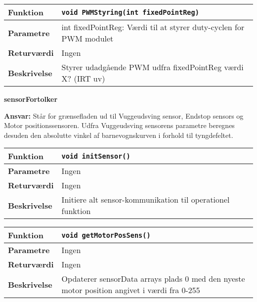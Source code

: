 \begin{center}
    \begin{tabular}{ | l | p{} |}
    \hline
    \textbf{Funktion}	& \verb+void PWMStyring(int fixedPointReg) +				\\ \hline
    \textbf{Parametre} 	& int fixedPointReg: Værdi til at styrer duty-cyclen for PWM modulet 		\\ \hline
    \textbf{Returværdi}	& Ingen														\\ \hline
    \textbf{Beskrivelse}	& Styrer udadgående PWM udfra fixedPointReg værdi X? (IRT uv)	\\ \hline
    \end{tabular}
\end{center}

{\centering
\textbf{sensorFortolker}\par
}
\textbf{Ansvar:} Står for grænsefladen ud til Vuggeudsving sensor, Endstop sensors og Motor positionssensoren. Udfra Vuggeudsving sensorens parametre beregnes desuden den absolutte vinkel af barnevognskurven i forhold til tyngdefeltet. \

\begin{center}
    \begin{tabular}{ | l | p{} |}
    \hline
    \textbf{Funktion}	& \verb+void initSensor() +				\\ \hline
    \textbf{Parametre} 	& Ingen							 		\\ \hline
    \textbf{Returværdi}	& Ingen									\\ \hline
    \textbf{Beskrivelse}	& Initiere alt sensor-kommunikation til operationel funktion	\\ \hline
    \end{tabular}
\end{center}

\begin{center}
    \begin{tabular}{ | l | p{} |}
    \hline
    \textbf{Funktion}	& \verb+void getMotorPosSens() +				\\ \hline
    \textbf{Parametre} 	& Ingen							 		\\ \hline
    \textbf{Returværdi}	& Ingen									\\ \hline
    \textbf{Beskrivelse}	& Opdaterer sensorData arrays plads 0 med den nyeste motor position angivet i værdi fra 0-255	\\ \hline
    \end{tabular}
\end{center}


